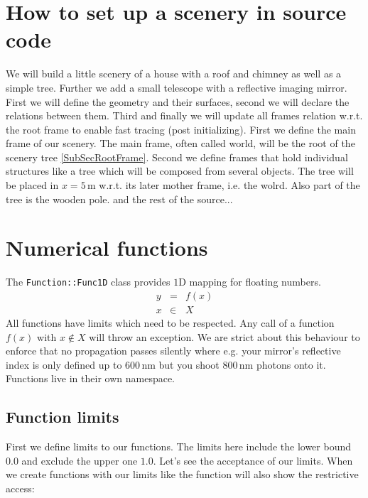 \documentclass[review]{elsarticle}
\begin{document}
\section{How to set up a scenery in source code}
%
We will build a little scenery of a house with a roof and chimney as well as a simple tree. Further we add a small telescope with a reflective imaging mirror.
%
First we will define the geometry and their surfaces, second we will declare the relations between them. Third and finally we will update all frames relation w.r.t. the root frame to enable fast tracing (post initializing).
% 
%
First we define the main frame of our scenery. The main frame, often called world, will be the root of the scenery tree \ref{SubSecRootFrame}. 
%
%
Second we define frames that hold individual structures like a tree which will be composed from several objects. The tree will be placed in $x=5\,$m w.r.t. its later mother frame, i.e. the wolrd. 
%
Also part of the tree is the wooden pole.
and the rest of the source...
\section{Numerical functions}
\newcommand{\la}{\lambda}
%
The \lstinline{Function::Func1D} class provides $1$D mapping for floating numbers.
%
\begin{eqnarray}
    y &=& f(x)\\
    x &\in& X
\end{eqnarray}
%
All functions have limits which need to be respected. 
%
Any call of a function $f(x)$ with $x \notin X$ will throw an exception. 
%
We are strict about this behaviour to enforce that no propagation passes silently where e.g. your mirror's reflective index is only defined up to $600\,$nm but you shoot $800\,$nm photons onto it. 
%
Functions live in their own namespace.
%
\subsection{Function limits}
%
First we define limits to our functions.
%
%
The limits here include the lower bound $0.0$ and exclude the upper one $1.0$.
%
Let's see the acceptance of our limits.
%
%
When we create functions with our limits like
%
%
the function will also show the restrictive access:
%
%
\end{document}
